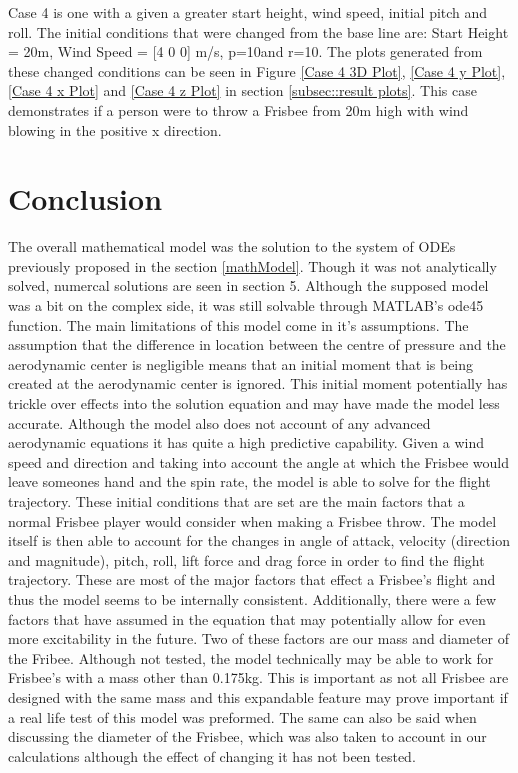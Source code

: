 \documentclass[12pt,twoside,letterpaper]{article}
\begin{document}
\begin{multicols}{2}
\par
Case 4 is one with a given a greater start height, wind speed, initial pitch and roll. The initial conditions that were changed from the base line are: Start Height = 20m, Wind Speed = [4 0 0] m/s, p=10\degree and r=10\degree. The plots generated from these changed conditions can be seen in Figure \ref{Case 4 3D Plot}, \ref{Case 4 y Plot}, \ref{Case 4 x Plot} and \ref{Case 4 z Plot} in section \ref{subsec::result plots}. This case demonstrates if a person were to throw a Frisbee from 20m high with wind blowing in the positive x direction.




\section{Conclusion}
The overall mathematical model was the solution to the system of ODEs previously proposed in the section \ref{mathModel}. Though it was not analytically solved, numercal solutions are seen in section 5. Although the supposed model was a bit on the complex side, it was still solvable through MATLAB's ode45 function. The main limitations of this model come in it's assumptions. The assumption that the difference in location between the centre of pressure and the aerodynamic center is negligible means that an initial moment that is being created at the aerodynamic center is ignored. This initial moment potentially has trickle over effects into the solution equation and may have made the model less accurate. Although the model also does not account of any advanced aerodynamic equations it has quite a high predictive capability. Given a wind speed and direction and taking into account the angle at which the Frisbee would leave someones hand and the spin rate, the model is able to solve for the flight trajectory. These initial conditions that are set are the main factors that a normal Frisbee player would consider when making a Frisbee throw. The model itself is then able to account for the changes in angle of attack, velocity (direction and magnitude), pitch, roll, lift force and drag force in order to find the flight trajectory. These are most of the major factors that effect a Frisbee's flight and thus the model seems to be internally consistent. Additionally, there were a few factors that have assumed in the equation that may potentially allow for even more excitability in the future. Two of these factors are our mass and diameter of the Fribee. Although not tested, the model technically may be able to work for Frisbee's with a mass other than 0.175kg. This is important as not all Frisbee are designed with the same mass and this expandable feature may prove important if a real life test of this model was preformed. The same can also be said when discussing the diameter of the Frisbee, which was also taken to account in our calculations although the effect of changing it has not been tested.


\end{multicols}
\end{document}
